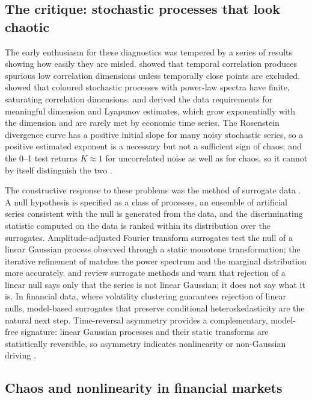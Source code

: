 \documentclass[11pt,a4paper]{article}
\begin{document}
\subsection{The critique: stochastic processes that look chaotic}

The early enthusiasm for these diagnostics was tempered by a series of results showing how easily they are
misled. \citet{Theiler1986} showed that temporal correlation produces spurious low correlation dimensions unless
temporally close points are excluded. \citet{OsborneProvenzale1989} showed that coloured stochastic processes with
power-law spectra have finite, saturating correlation dimensions. \citet{Ruelle1990} and \citet{EckmannRuelle1992}
derived the data requirements for meaningful dimension and Lyapunov estimates, which grow exponentially with the
dimension and are rarely met by economic time series. The Rosenstein divergence curve has a positive initial slope
for many noisy stochastic series, so a positive estimated exponent is a necessary but not a sufficient sign of
chaos; and the 0--1 test returns $K\approx 1$ for uncorrelated noise as well as for chaos, so it cannot by itself
distinguish the two \citep{GottwaldMelbourne2009}.

The constructive response to these problems was the method of surrogate data \citep{Theiler1992}. A null
hypothesis is specified as a class of processes, an ensemble of artificial series consistent with the null is
generated from the data, and the discriminating statistic computed on the data is ranked within its distribution
over the surrogates. Amplitude-adjusted Fourier transform surrogates test the null of a linear Gaussian process
observed through a static monotone transformation; the iterative refinement of \citet{SchreiberSchmitz1996}
matches the power spectrum and the marginal distribution more accurately. \citet{SchreiberSchmitz2000} and
\citet{Lancaster2018} review surrogate methods and warn that rejection of a linear null says only that the series is
not linear Gaussian; it does not say what it is. In financial data, where volatility clustering guarantees
rejection of linear nulls, model-based surrogates that preserve conditional heteroskedasticity are the natural
next step. Time-reversal asymmetry provides a complementary, model-free signature: linear Gaussian processes and
their static transforms are statistically reversible, so asymmetry indicates nonlinearity or non-Gaussian driving
\citep{Diks1995,RamseyRothman1996}.

\subsection{Chaos and nonlinearity in financial markets}
\end{document}
